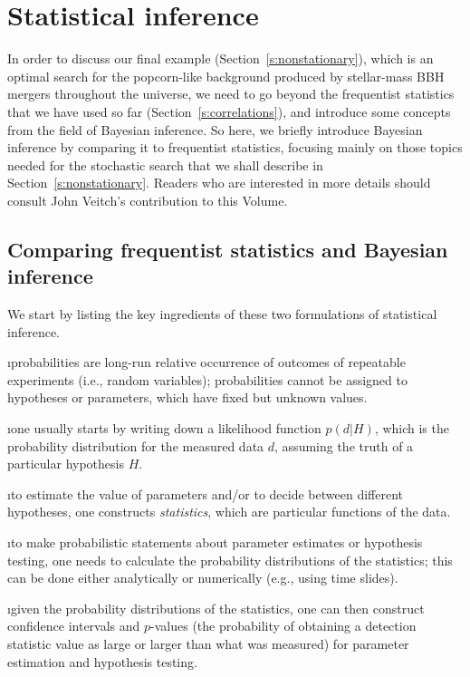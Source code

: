 \section{Statistical inference}
\label{s:statistical_inference}

In order to discuss our final example (Section~\ref{s:nonstationary}),
which is an optimal search for the popcorn-like background
produced by stellar-mass BBH mergers throughout the 
universe, we need to go beyond the frequentist 
statistics that we have used so far 
(Section~\ref{s:correlations}), 
and introduce some concepts from the field of Bayesian inference.
So here, we briefly introduce Bayesian inference by comparing 
it to frequentist statistics, focusing mainly on those topics 
needed for the stochastic search that we shall describe in
Section~\ref{s:nonstationary}.
Readers who are interested in more details should 
consult John Veitch's contribution to this Volume.

\subsection{Comparing frequentist statistics and Bayesian inference}

We start by listing the key ingredients of these two formulations 
of statistical inference.
\medskip


\bi

\i probabilities are long-run relative occurrence of 
outcomes of repeatable experiments (i.e., random variables);
probabilities cannot be assigned to hypotheses or parameters, 
which have fixed but unknown values.

\i one usually starts by writing down a likelihood 
function $p(d|H)$, which is the probability distribution 
for the measured data $d$, assuming the truth of a particular
hypothesis $H$.

\i to estimate the value of parameters and/or to decide
between different hypotheses, one constructs 
{\em statistics}, which are particular functions of the data.

\i to make probabilistic statements about 
parameter estimates or hypothesis testing, 
one needs to calculate
the probability distributions of the statistics;
this can be done either analytically or numerically 
(e.g., using time slides).

\i given the probability distributions of the statistics,
one can then construct confidence intervals and 
$p$-values (the probability of obtaining a detection
statistic value as large or larger than what was measured) 
for parameter estimation and hypothesis testing.

